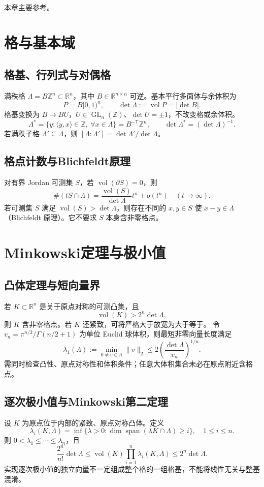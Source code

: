 \documentclass[../main.tex]{subfiles}
\begin{document}
本章主要参考\cite{cassels}。

\section{格与基本域}
\subsection{格基、行列式与对偶格}
满秩格 $\Lambda=B\mathbb Z^n\subset\mathbb R^n$，其中 $B\in\mathbb R^{n\times n}$ 可逆。基本平行多面体与余体积为
\[
P=B[0,1)^n,\qquad\det\Lambda:=\operatorname{vol}P=|\det B|.
\]
格基变换为 $B\mapsto BU$，$U\in\operatorname{GL}_n(\mathbb Z)$、$\det U=\pm1$，不改变格或余体积。
\[
\Lambda^*=\{y:\langle y,x\rangle\in\mathbb Z,\ \forall x\in\Lambda\}
=B^{-\mathsf T}\mathbb Z^n,\qquad \det\Lambda^*=(\det\Lambda)^{-1}.
\]
若满秩子格 $\Lambda'\subseteq\Lambda$，则 $[\Lambda:\Lambda']=\det\Lambda'/\det\Lambda$。
\subsection{格点计数与Blichfeldt原理}
对有界 Jordan 可测集 $S$，若 $\operatorname{vol}(\partial S)=0$，则
\[
\#(tS\cap\Lambda)=\frac{\operatorname{vol}(S)}{\det\Lambda}t^n+o(t^n)
\quad(t\to\infty).
\]
若可测集 $S$ 满足 $\operatorname{vol}(S)>\det\Lambda$，则存在不同的 $x,y\in S$ 使 $x-y\in\Lambda$（Blichfeldt 原理）。它不要求 $S$ 本身含非零格点。
\section{Minkowski定理与极小值}
\subsection{凸体定理与短向量界}
若 $K\subset\mathbb R^n$ 是关于原点对称的可测凸集，且
\[
\operatorname{vol}(K)>2^n\det\Lambda,
\]
则 $K$ 含非零格点。若 $K$ 还紧致，可将严格大于放宽为大于等于。
令 $v_n=\pi^{n/2}/\Gamma(n/2+1)$ 为单位 Euclid 球体积，则最短非零向量长度满足
\[
\lambda_1(\Lambda):=\min_{0\ne v\in\Lambda}\|v\|_2
\le2\left(\frac{\det\Lambda}{v_n}\right)^{1/n}.
\]
需同时检查凸性、原点对称性和体积条件；任意大体积集合未必在原点附近含格点。
\subsection{逐次极小值与Minkowski第二定理}
设 $K$ 为原点位于内部的紧致、原点对称凸体。定义
\[
\lambda_i(K,\Lambda)=\inf\{\lambda>0:
\dim\operatorname{span}(\lambda K\cap\Lambda)\ge i\},\quad 1\le i\le n.
\]
则 $0<\lambda_1\le\cdots\le\lambda_n$，且
\[
\frac{2^n}{n!}\det\Lambda\le
\operatorname{vol}(K)\prod_{i=1}^n\lambda_i(K,\Lambda)
\le2^n\det\Lambda.
\]
实现逐次极小值的独立向量不一定组成整个格的一组格基，不能将线性无关与整基混淆。
\end{document}
